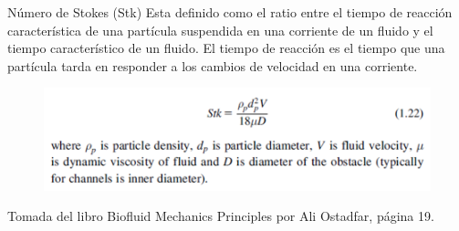 \begin{frame}{Número de Stokes (Stk)}
\justifying
Esta definido como el ratio entre el tiempo de reacción característica de una partícula suspendida en una corriente de un fluido y el tiempo característico de un fluido. El tiempo de reacción es el tiempo que una partícula tarda en responder a los cambios de velocidad en una corriente.
\begin{figure}[H]
\centering
\includegraphics[scale=0.4]{Section_Files/picmanuel/50.png}
\label{fig: Figura2-40}
\end{figure}
{\tiny Tomada del libro Biofluid Mechanics Principles por Ali Ostadfar, página 19.}
\end{frame}






